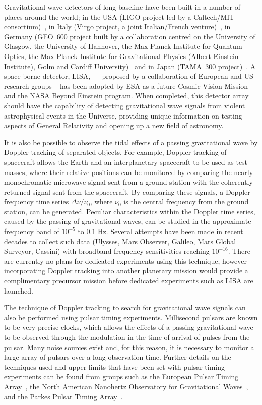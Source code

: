 \documentclass{article}
\begin{document}
Gravitational wave detectors of long baseline have been built in a number of
places around the world; in the USA (LIGO project led by a Caltech/MIT
consortium)~\cite{LIGOS5, LIGOweb}, in Italy (Virgo project, a joint
Italian/French venture)~\cite{Acernese:2007, Virgoweb}, in Germany (GEO~600
project built by a collaboration centred on the University of Glasgow, the
University of Hannover, the Max Planck Institute for Quantum Optics, the Max
Planck Institute for Gravitational Physics (Albert Einstein Institute), Golm and
Cardiff University)~\cite{Willke:2007, GEOweb} and in Japan (TAMA~300
project)~\cite{TAMAStatus, TAMAweb}. A space-borne detector, LISA,~\cite{LISA,
NASAweb, ESAweb} -- proposed by a collaboration of European and US research
groups -- has been adopted by ESA as a future Cosmic Vision Mission and the NASA
Beyond Einstein program. When completed, this detector array should have the
capability of detecting gravitational wave signals from violent astrophysical
events in the Universe, providing unique information on testing aspects of
General Relativity and opening up a new field of astronomy.

It is also be possible to observe the tidal effects of a passing gravitational 
wave by Doppler tracking of separated objects.  For example, Doppler tracking of
spacecraft allows the Earth and an interplanetary spacecraft to be used as test
masses, where their relative positions can be monitored by comparing the nearly
monochromatic microwave signal sent from a ground station with the coherently
returned signal sent from the spacecraft.  By comparing these signals, a Doppler
frequency time series $\Delta \nu / \nu_0$, where $\nu_0$ is the central
frequency from the ground station, can be generated.  Peculiar characteristics
within the Doppler time series, caused by the passing of gravitational waves,
can be studied in the approximate frequency band of $10^{-5}$ to $0.1$ Hz. 
Several attempts have been made in recent decades to collect such data (Ulysses,
Mars Observer, Galileo, Mars Global Surveyor, Cassini) with broadband frequency
sensitivities reaching $10^{-16}$. There are currently no plans for dedicated
experiments using this technique, however incorporating Doppler tracking into
another planetary mission would provide a complimentary precursor mission before
dedicated experiments such as LISA are launched.

The technique of Doppler tracking to search for gravitational wave signals can 
also be performed using pulsar timing experiments.  Millisecond pulsars
\cite{Lorimer:2008} are known to be very precise clocks, which allows the
effects of a passing gravitational wave to be observed through the modulation in
the time of arrival of pulses from the pulsar.  Many noise sources exist and,
for this reason, it is necessary to monitor a large array of pulsars over a long
observation time.  Further details on the techniques used and upper limits that
have been set with pulsar timing experiments can be found from groups such as
the European Pulsar Timing Array~\cite{Janssen:2008}, the North American
Nanohertz Observatory for Gravitational Waves~\cite{Jenet:2006,Jenet:2009}, and
the Parkes Pulsar Timing Array~\cite{Hobbs:2008}.
\end{document}

